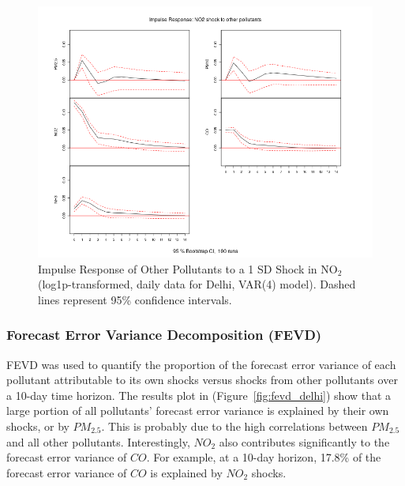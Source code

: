 \documentclass[fleqn,10pt]{SelfArx} %
\begin{document}
\begin{figure}[ht]
    \centering
    \includegraphics[width=\linewidth]{../analysis/assets/irf_no2_others.png}
    \caption{Impulse Response of Other Pollutants to a 1 SD Shock in $\text{NO}_{2}$ (log1p-transformed, daily data for Delhi, VAR(4) model). Dashed lines represent 95\% confidence intervals.}
    \label{fig:irf_no2_others}
\end{figure}

\subsubsection{Forecast Error Variance Decomposition (FEVD)}
FEVD was used to quantify the proportion of the forecast error variance of each pollutant attributable to its own shocks versus shocks from other pollutants over a 10-day time horizon. The results plot in (Figure~\ref{fig:fevd_delhi}) show that a large portion of all pollutants' forecast error variance is explained by their own shocks, or by $PM_{2.5}$. This is probably due to the high correlations between $PM_{2.5}$ and all other pollutants. Interestingly, $NO_{2}$ also contributes significantly to the forecast error variance of $CO$. For example, at a 10-day horizon, 17.8\% of the forecast error variance of $CO$ is explained by $NO_{2}$ shocks.
\end{document}
